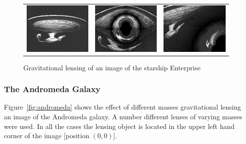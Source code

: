 \documentclass[a4paper]{IEEEtran}
\begin{document}
\begin{figure}
    \caption{Gravitational lensing of an image of the starship Enterprise} 
    \label{fig:enterprise} 
    \begin{center}
        \begin{tabular}{ccc}
            \includegraphics[width=0.6\columnwidth]{pics/1701.eps} &
            \includegraphics[width=0.6\columnwidth]{pics/ent_2e30.eps} &
            \includegraphics[width=0.6\columnwidth]{pics/ent_1e31.eps} 
        \end{tabular}
    \end{center}
\end{figure}

\subsubsection{The Andromeda Galaxy}     
Figure~\ref{fig:andromeda} shows the effect of different masses gravitational lensing
an image of the Andromeda galaxy.  A number different lenses
of varying masses were used. In all the cases the lensing object
is located in the upper left hand corner of the image [position $(0,0)$].
\end{document}
